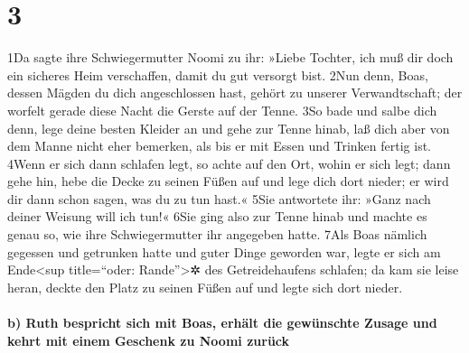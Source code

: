 \hypertarget{section-2}{%
\section{3}\label{section-2}}

1Da sagte ihre Schwiegermutter Noomi zu ihr: »Liebe Tochter, ich muß dir
doch ein sicheres Heim verschaffen, damit du gut versorgt bist. 2Nun
denn, Boas, dessen Mägden du dich angeschlossen hast, gehört zu unserer
Verwandtschaft; der worfelt gerade diese Nacht die Gerste auf der Tenne.
3So bade und salbe dich denn, lege deine besten Kleider an und gehe zur
Tenne hinab, laß dich aber von dem Manne nicht eher bemerken, als bis er
mit Essen und Trinken fertig ist. 4Wenn er sich dann schlafen legt, so
achte auf den Ort, wohin er sich legt; dann gehe hin, hebe die Decke zu
seinen Füßen auf und lege dich dort nieder; er wird dir dann schon
sagen, was du zu tun hast.« 5Sie antwortete ihr: »Ganz nach deiner
Weisung will ich tun!« 6Sie ging also zur Tenne hinab und machte es
genau so, wie ihre Schwiegermutter ihr angegeben hatte. 7Als Boas
nämlich gegessen und getrunken hatte und guter Dinge geworden war, legte
er sich am Ende\textless sup title=``oder: Rande''\textgreater✲ des
Getreidehaufens schlafen; da kam sie leise heran, deckte den Platz zu
seinen Füßen auf und legte sich dort nieder.

\hypertarget{b-ruth-bespricht-sich-mit-boas-erhuxe4lt-die-gewuxfcnschte-zusage-und-kehrt-mit-einem-geschenk-zu-noomi-zuruxfcck}{%
\paragraph{b) Ruth bespricht sich mit Boas, erhält die gewünschte Zusage
und kehrt mit einem Geschenk zu Noomi
zurück}\label{b-ruth-bespricht-sich-mit-boas-erhuxe4lt-die-gewuxfcnschte-zusage-und-kehrt-mit-einem-geschenk-zu-noomi-zuruxfcck}}

